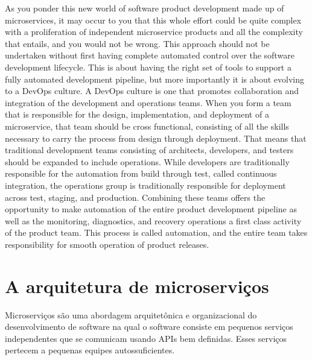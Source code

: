As you ponder this new world of software product development made up of microservices, it may occur to you that this whole effort could be quite complex with a proliferation of independent microservice products and all the complexity that entails, and you would not be wrong. This approach should not be undertaken without first having complete automated control over the software development lifecycle. This is about having the right set of tools to support a fully automated development pipeline, but more importantly it is about evolving to a DevOps culture. A DevOps culture is one that promotes collaboration and integration of the development and operations teams. When you form a team that is responsible for the design, implementation, and deployment of a microservice, that team should be cross functional, consisting of all the skills necessary to carry the process from design through deployment. That means that traditional development teams consisting of architects, developers, and testers should be expanded to include operations. While developers are traditionally responsible for the automation from build through test, called continuous integration, the operations group is traditionally responsible for deployment across test, staging, and production. Combining these teams offers the opportunity to make automation of the entire product development pipeline as well as the monitoring, diagnostics, and recovery operations a first class activity of the product team. This process is called automation, and the entire team takes responsibility for smooth operation of product releases.

\section{A arquitetura de microserviços}

Microserviços são uma abordagem arquitetônica e organizacional do desenvolvimento de software na qual o software consiste em pequenos serviços independentes que se comunicam usando APIs bem definidas. Esses serviços pertecem a pequenas equipes autossuficientes.

